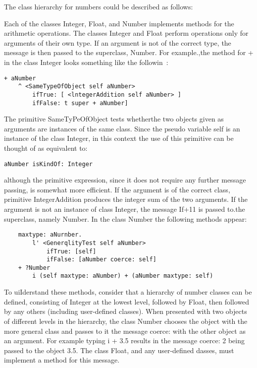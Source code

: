 
The class hierarchy for numbers could be described as follows:


\noindent
Each of the classes Integer, Float, and Number implements methods for the
arithmetic operations. The classes Integer and Float perform operations only for
arguments of their own type. If an argument is not of the correct type, the
message is then passed to the superclass, Number. For example.,the method for +
in the class Integer looks something like the followin~:
\begin{lstlisting}
+ aNumber
    ^ <SameTypeOfObject self aNumber>
        ifTrue: [ <lntegerAddition self aNumber> ]
        ifFalse: t super + aNumber]
\end{lstlisting}

The primitive SameTyPeOfObject tests whetherthe two objects given as arguments
are instances of the same class. Since the pseudo variable self is an instance
of the class Integer, in this context the use of this primitive can be thought
of as equivalent to:
\begin{lstlisting}
aNumber isKindOf: Integer
\end{lstlisting}
although the primitive expression, since it does not require any further message
passing, is somewhat more efficient. If the argument is of the correct class, primitive
IntegerAddition produces the integer sum of the two arguments. If the argument
is not an instance of class Integer, the message If+11 is passed to.the
superclass, namely Number. In the class Number the following methods appear:
\begin{lstlisting}
    maxtype: aNurnber.
        l' <GenerqlityTest self aNumber>
            ifTrue: [self]
            ifFalse: [aNumber coerce: self]
    + ?Number
        i (self maxtype: aNumber) + (aNumber maxtype: self)
\end{lstlisting}

To uiIderstand these methods, consider that a hierarchy of number classes can be
defined, consisting of Integer at the lowest level, followed by Float, then
followed by any others (including user-defined classes). When presented with two
objects of different levels in the hierarchy, the class Number chooses the
object with the more general class and passes to it the message coerce: with the
other object as an argument. For example typing i + 3.5 results in the message
coerce: 2 being passed to the object 3.5. The class Float, and any user-defined
dasses, must implement a method for this message.

